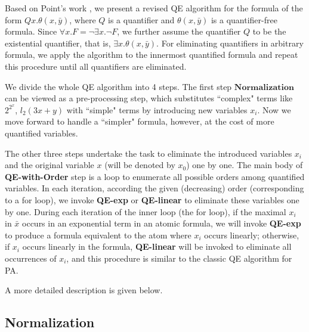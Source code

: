 Based on Point's work \cite{Point86}, we present a  revised QE algorithm for the formula of the form $Qx.\theta(x,\bar{y})$, 
where $Q$ is a quantifier and $\theta(x,\bar{y})$ is a quantifier-free formula. 
Since $\forall x. F = \neg \exists x. \neg F$, we further assume the quantifier $Q$ to be the existential quantifier, 
that is, $\exists x.\theta(x,\bar{y})$. 
For eliminating quantifiers in arbitrary formula, 
we apply the algorithm to the innermost quantified formula and repeat this procedure until all quantifiers are eliminated.

We divide the whole QE algorithm into 4 steps.
The first step $\textbf{Normalization}$ can be viewed as a pre-processing step, which substitutes ``complex" terms like $2^{2^x}$, $l_2(3x+y)$ with ``simple" terms by introducing new variables $x_i$. Now we move forward to handle a ``simpler" formula, however, at the cost of more quantified variables.

The other three steps undertake the task to eliminate the introduced variables $x_i$ and the original variable $x$ (will be denoted by $x_0$) one by one. 
The main body of \textbf{QE-with-Order} step is a loop to enumerate all possible orders among quantified variables. 
In each iteration, according the given (decreasing) order (corresponding to a for loop), we invoke \textbf{QE-exp} or 
\textbf{QE-linear} to eliminate these variables one by one. 
During each iteration of the inner loop (the for loop), 
if the maximal $x_i$ in $\bar{x}$ occurs in an exponential term in an atomic formula, 
we will invoke \textbf{QE-exp} to produce a formula equivalent to the atom where $x_i$ occurs linearly;  
otherwise, if $x_i$ occurs linearly in the formula, \textbf{QE-linear} will be invoked to eliminate all occurrences of $x_i$, 
and this procedure is similar to the classic QE algorithm for PA. 

A more detailed description is given below.

\subsection{Normalization}

